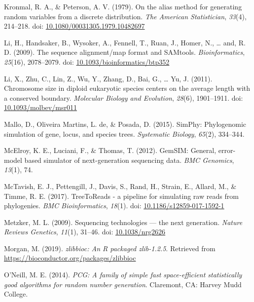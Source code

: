 \documentclass[12pt,]{article}
\begin{document}
\leavevmode\hypertarget{ref-Kronmal_1979}{}%
Kronmal, R. A., \& Peterson, A. V. (1979). On the alias method for generating random variables from a discrete distribution. \emph{The American Statistician}, \emph{33}(4), 214--218. doi: \href{https://doi.org/10.1080/00031305.1979.10482697}{10.1080/00031305.1979.10482697}

\leavevmode\hypertarget{ref-Li_2009}{}%
Li, H., Handsaker, B., Wysoker, A., Fennell, T., Ruan, J., Homer, N., \ldots{} and, R. D. (2009). The sequence alignment/map format and SAMtools. \emph{Bioinformatics}, \emph{25}(16), 2078--2079. doi: \href{https://doi.org/10.1093/bioinformatics/btp352}{10.1093/bioinformatics/btp352}

\leavevmode\hypertarget{ref-Li_2011}{}%
Li, X., Zhu, C., Lin, Z., Wu, Y., Zhang, D., Bai, G., \ldots{} Yu, J. (2011). Chromosome size in diploid eukaryotic species centers on the average length with a conserved boundary. \emph{Molecular Biology and Evolution}, \emph{28}(6), 1901--1911. doi: \href{https://doi.org/10.1093/molbev/msr011}{10.1093/molbev/msr011}

\leavevmode\hypertarget{ref-Mallo_2015}{}%
Mallo, D., Oliveira Martins, L. de, \& Posada, D. (2015). SimPhy: Phylogenomic simulation of gene, locus, and species trees. \emph{Systematic Biology}, \emph{65}(2), 334--344.

\leavevmode\hypertarget{ref-McElroy_2012}{}%
McElroy, K. E., Luciani, F., \& Thomas, T. (2012). GemSIM: General, error-model based simulator of next-generation sequencing data. \emph{BMC Genomics}, \emph{13}(1), 74.

\leavevmode\hypertarget{ref-McTavish_2017}{}%
McTavish, E. J., Pettengill, J., Davis, S., Rand, H., Strain, E., Allard, M., \& Timme, R. E. (2017). TreeToReads - a pipeline for simulating raw reads from phylogenies. \emph{BMC Bioinformatics}, \emph{18}(1). doi: \href{https://doi.org/10.1186/s12859-017-1592-1}{10.1186/s12859-017-1592-1}

\leavevmode\hypertarget{ref-Metzker_2009}{}%
Metzker, M. L. (2009). Sequencing technologies --- the next generation. \emph{Nature Reviews Genetics}, \emph{11}(1), 31--46. doi: \href{https://doi.org/10.1038/nrg2626}{10.1038/nrg2626}

\leavevmode\hypertarget{ref-Morgan_2019}{}%
Morgan, M. (2019). \emph{zlibbioc: An R packaged zlib-1.2.5}. Retrieved from \url{https://bioconductor.org/packages/zlibbioc}

\leavevmode\hypertarget{ref-Oneill_2014pcg}{}%
O'Neill, M. E. (2014). \emph{PCG: A family of simple fast space-efficient statistically good algorithms for random number generation}. Claremont, CA: Harvey Mudd College.
\end{document}
